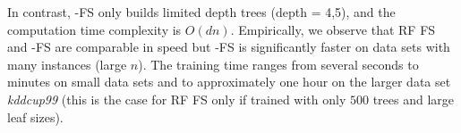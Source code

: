 In contrast, \name{}-FS only builds limited depth trees (depth = 4,5), and the computation time complexity is $O(dn)$. Empirically, we observe that RF FS and \name{}-FS are comparable in speed but \name{}-FS is significantly faster on data sets with many instances (large $n$). The training time ranges from several seconds to minutes on small data sets and to approximately one hour on the larger data set \emph{kddcup99} (this is the case for RF FS only if trained with only $500$ trees and large leaf sizes). 
















